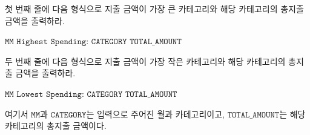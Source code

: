 
첫 번째 줄에 다음 형식으로 지출 금액이 가장 큰 카테고리와 해당 카테고리의 총지출 금액을 출력하라.

$\texttt{MM Highest Spending: CATEGORY TOTAL_AMOUNT}$

두 번째 줄에 다음 형식으로 지출 금액이 가장 작은 카테고리와 해당 카테고리의 총지출 금액을 출력하라.

$\texttt{MM Lowest Spending: CATEGORY TOTAL_AMOUNT}$

여기서 $\texttt{MM}$과 $\texttt{CATEGORY}$는 입력으로 주어진 월과 카테고리이고, $\texttt{TOTAL_AMOUNT}$는 해당 카테고리의 총지출 금액이다.
